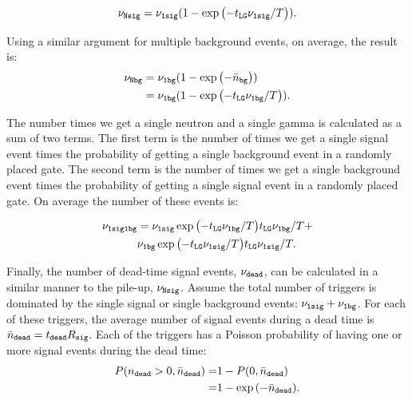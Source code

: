 \documentclass[twocolumn]{bmcart}
\begin{document}
\begin{backmatter}
\begin{equation} \label{eq:Nsig} 
\nu_{\tt N sig} = \nu_{\tt 1 sig} ( 1 - \exp{ \left( -t_{\tt LG} \nu_{\tt 1 sig} / T \right) } ) .  
\end{equation}

Using a similar argument for multiple background events, on average,
the result is:
\begin{align}\label{eq:Nbg}
\nu_{\tt N bg} &= \nu_{\tt 1 bg} ( 1 - \exp{ \left( -\bar{n}_{\tt bg} \right) } ) \nonumber \\
             &=  \nu_{\tt 1 bg} ( 1 - \exp{ \left( -t_{\tt LG} \nu_{\tt 1 bg} / T \right) } ).  
\end{align}

The number times we get a single neutron and a single gamma is
calculated as a sum of two terms.  The first term is the number of
times we get a single signal event times the probability of getting a
single background event in a randomly placed gate.  The second term is
the number of times we get a single background event times the
probability of getting a single signal event in a randomly placed
gate.  On average the number of these events is:

\begin{align}
\nu_{\tt 1 sig 1 bg} &= 
           \nu_{\tt 1 sig} \exp{ \left( -t_{\tt LG} \nu_{\tt 1 bg} / T \right) } t_{\tt LG} \nu_{\tt 1 bg} / T + \nonumber \\
         & \nu_{\tt 1 bg} \exp{ \left( -t_{\tt LG} \nu_{\tt 1 sig} / T \right) } t_{\tt LG} \nu_{\tt 1 sig} /T.
\end{align}

Finally, the number of dead-time signal events, $\nu_{\tt dead}$, can
be calculated in a similar manner to the pile-up, $\nu_{\tt N sig}$.
Assume the total number of triggers is dominated by the single signal
or single background events: $\nu_{\tt 1 sig} + \nu_{\tt 1 bg}$.  For
each of these triggers, the average number of signal events during a
dead time is $\bar{n}_{\tt dead} = t_{\tt dead} R_{\tt sig}$.  Each of
the triggers has a Poisson probability of having one or more signal
events during the dead time:
\begin{align*}
P( n_{\tt dead} > 0, \bar{n}_{\tt dead} ) =& 1 -  P( 0, \bar{n}_{\tt dead} ) \nonumber \\
                                     =& 1 - \exp{ \left( -\bar{n}_{\tt dead} \right) } .
\end{align*}


\end{backmatter}
\end{document}
